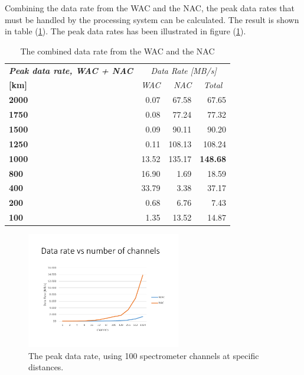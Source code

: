 Combining the data rate from the WAC and the NAC, the peak data rates that must be handled by the processing system can be calculated. The result is shown in table (\ref{tab:peak_data_wac_nac}). The peak data rates has been illustrated in figure (\ref{fig:imaging_data_peak_throughput}).
\begin{table}[htb!]
  \centering
    \begin{tabular}{l|r|r|r|}
\textit{\textbf{Peak data rate, WAC + NAC}} & \multicolumn{3}{c|}{\textit{Data Rate [MB/s]}} \bigstrut[b]\\
\cline{1-1}\textbf{[km]} & \textit{WAC} & \textit{NAC} & \multicolumn{1}{c|}{\textit{Total}} \bigstrut\\
\hline
\textbf{2000} & 0.07  & \multicolumn{1}{r}{67.58} & 67.65 \bigstrut[t]\\
\textbf{1750} & 0.08  & \multicolumn{1}{r}{77.24} & 77.32 \\
\textbf{1500} & 0.09  & \multicolumn{1}{r}{90.11} & 90.20 \\
\textbf{1250} & 0.11  & \multicolumn{1}{r}{108.13} & 108.24 \\
\textbf{1000} & 13.52 & \multicolumn{1}{r}{135.17} & \textbf{148.68} \\
\textbf{800} & 16.90 & \multicolumn{1}{r}{1.69} & 18.59 \\
\textbf{400} & 33.79 & \multicolumn{1}{r}{3.38} & 37.17 \\
\textbf{200} & 0.68  & \multicolumn{1}{r}{6.76} & 7.43 \\
\textbf{100} & 1.35  & \multicolumn{1}{r}{13.52} & 14.87 \\
\end{tabular}%
    \caption{The combined data rate from the WAC and the NAC}
  \label{tab:peak_data_wac_nac}%
\end{table}%
\begin{figure}[htb!]
\centering
\includegraphics[width=0.6\textwidth,page=2,trim=15mm 15mm 15mm 32mm,clip]{figures/Orbiter/Graphs_excel.pdf}
\caption{The peak data rate, using 100 spectrometer channels at specific distances.}
\label{fig:imaging_data_peak_throughput}
\end{figure}

